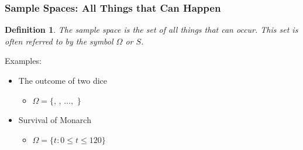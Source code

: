 \documentclass{beamer}
\def\die#1{{\domino#1}}
\newtheorem{defn}{Definition}
\numberwithin{equation}{section}
\begin{document}
\begin{frame}
\frametitle{Sample Spaces: All Things that Can Happen}

\begin{defn}
The \alert{sample space} is the set of all things that can occur.  This set is often referred to by the symbol $\Omega$ or $S$.
\end{defn}
\pause 
{Examples: } \pause 
\begin{itemize}
\item[1)] The outcome of two dice  \pause
\begin{itemize}
\item[-] $\Omega = \{$\die1\die1, \die1\die2 ,  $\hdots,$ \die6\die6$ \}$ \pause
\end{itemize}
\item[2)] Survival of Monarch \pause
\begin{itemize}
\item[-] $\Omega = \{t: 0\leq t \leq 120\}$ 
\end{itemize}

\end{itemize}
\end{frame}
\end{document}
